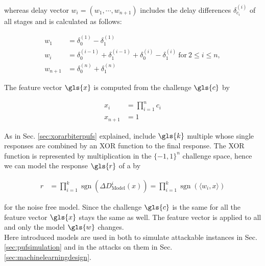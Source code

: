 whereas delay vector $w_i = (w_1, \cdots, w_{n+1})$ includes the delay differences $\delta_{c_i}^{(i)}$ of all stages and is calculated as follows:

\begin{align*}
w_1 &= \delta_{0}^{(1)} - \delta_{1}^{(1)}\\
w_i &= \delta_{0}^{(i-1)} + \delta_{1}^{(i-1)} + \delta_{0}^{(i)} - \delta_{1}^{(i)}\ \text{for}\ 2 \le i \le n,\\
w_{n+1} &= \delta_{0}^{(n)} + \delta_{1}^{(n)}
\end{align*}
 
The feature vector $\gls{x}$ is computed from the challenge $\gls{c}$ by

\begin{equation}
\begin{aligned}
x_i &= \prod_{i=1}^n c_i\\ 
x_{n+1} &= 1 \label{equ:featurevector}
\end{aligned}
\end{equation}

As in Sec. \ref{sec:xorarbiterpufs} explained, \xpufs include $\gls{k}$ multiple \apufs whose single responses are combined by an \ac{XOR} function to the final response.
The \ac{XOR} function is represented by multiplication in the $\{-1,1\}^n$ challenge space, hence we can model the response $\gls{r}$ of a \xpuf by

\begin{align*}
r &= \prod_{i=1}^k \operatorname{sgn}(\Delta D_{\mathrm{Model}}^i(x)) = \prod_{i=1}^k \operatorname{sgn}(\langle w_i,x\rangle)
\end{align*}

for the noise free \xpuf model.
Since the challenge $\gls{c}$ is the same for all \apufs the feature vector $\gls{x}$ stays the same as well.
The feature vector is applied to all \apufs and only the \apuf model $\gls{w}$ changes.\\
Here introduced models are used in both to simulate attackable \apuf instances in Sec. \ref{sec:pufsimulation} and in the attacks on them in Sec. \ref{sec:machinelearningdesign}.





